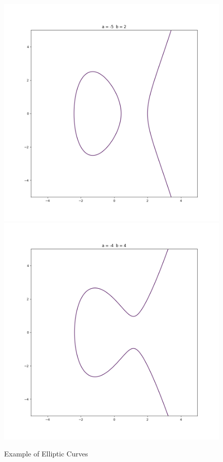 \documentclass[a4paper,12pt]{report}
\begin{document}
\cleardoublepage
\begin{figure}[h!]
	\caption{Example of Elliptic Curves}
	\includegraphics[scale=0.30]{Figure_3}
	\includegraphics[scale=0.30]{Figure_4}	
\end{figure}
\end{document}
